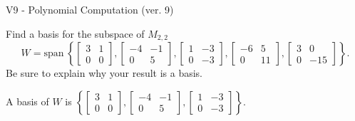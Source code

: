 \begin{exercise}
  \begin{exerciseTitle}V9 - Polynomial Computation (ver. 9)\end{exerciseTitle}
  \begin{exerciseStatement}
    Find a basis for the subspace of \(M_{2,2}\) 
\[W=\mathrm{span}\ \left\{\left[\begin{array}{cc}
3 & 1 \\
0 & 0
\end{array}\right] , \left[\begin{array}{cc}
-4 & -1 \\
0 & 5
\end{array}\right] , \left[\begin{array}{cc}
1 & -3 \\
0 & -3
\end{array}\right] , \left[\begin{array}{cc}
-6 & 5 \\
0 & 11
\end{array}\right] , \left[\begin{array}{cc}
3 & 0 \\
0 & -15
\end{array}\right]\right\}.\]
 Be sure to explain why your result is a basis.


  \end{exerciseStatement}
  \begin{exerciseAnswer}
   A basis of \(W\) is  \(\left\{\left[\begin{array}{cc}
3 & 1 \\
0 & 0
\end{array}\right] , \left[\begin{array}{cc}
-4 & -1 \\
0 & 5
\end{array}\right] , \left[\begin{array}{cc}
1 & -3 \\
0 & -3
\end{array}\right]\right\}\).
  


  \end{exerciseAnswer}
\end{exercise}